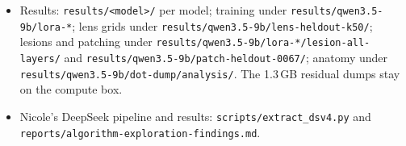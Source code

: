 \documentclass[11pt]{article}
\newcommand{\ttt}[1]{\texttt{\small #1}}
\begin{document}
\begin{raggedright}
\begin{itemize}
\item Results: \ttt{results/\allowbreak <model>/\allowbreak } per model; training under \ttt{results/\allowbreak qwen3.5-9b/\allowbreak lora-*}; lens grids under \ttt{results/\allowbreak qwen3.5-9b/\allowbreak lens-heldout-k50/\allowbreak }; lesions and patching under \ttt{results/\allowbreak qwen3.5-9b/\allowbreak lora-*/\allowbreak lesion-all-layers/\allowbreak } and \ttt{results/\allowbreak qwen3.5-9b/\allowbreak patch-heldout-0067/\allowbreak }; anatomy under \ttt{results/\allowbreak qwen3.5-9b/\allowbreak dot-dump/\allowbreak analysis/\allowbreak }. The 1.3\,GB residual dumps stay on the compute box.
\item Nicole's DeepSeek pipeline and results: \ttt{scripts/\allowbreak extract\_dsv4.py} and \ttt{reports/\allowbreak algorithm-exploration-findings.md}.
\end{itemize}
\end{raggedright}
\end{document}
